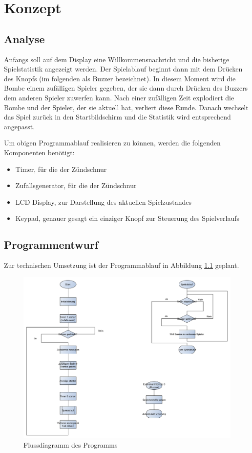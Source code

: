 \chapter{Konzept} \label{section:konzept}

\section{Analyse}

Anfangs soll auf dem Display eine Willkommensnachricht und die bisherige Spielstatistik angezeigt werden. Der Spielablauf beginnt dann mit dem Drücken des Knopfs (im folgenden als Buzzer bezeichnet). In diesem Moment wird die Bombe einem zufälligen Spieler gegeben, der sie dann durch Drücken des Buzzers dem anderen Spieler zuwerfen kann. Nach einer zufälligen Zeit explodiert die Bombe und der Spieler, der sie aktuell hat, verliert diese Runde. Danach wechselt das Spiel zurück in den Startbildschirm und die Statistik wird entsprechend angepasst.

Um obigen Programmablauf realisieren zu können, werden die folgenden Komponenten benötigt:

\begin{itemize}
	\item Timer, für die  der Zündschnur
	\item Zufallsgenerator, für die  der Zündschnur
	\item LCD Display, zur Darstellung des aktuellen Spielzustandes
	\item Keypad, genauer gesagt ein einziger Knopf zur Steuerung des Spielverlaufs
\end{itemize}

\section{Programmentwurf}

Zur technischen Umsetzung ist der Programmablauf in Abbildung \ref{img:flussdiagramm} geplant.

\begin{figure}[htbp]
	\centering
	\includegraphics[scale=0.45]{img/Flussdiagramm}
	\caption{Flussdiagramm des Programms}
	\label{img:flussdiagramm}
\end{figure}

